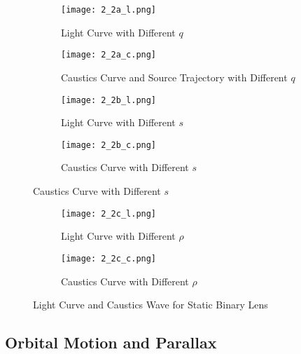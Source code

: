 \documentclass[preprint]{aastex63}
\begin{document}
\bigskip
\begin{figure}[h]
\centering
\begin{subfigure}{.49\textwidth}
  \centering
  \texttt{[image: 2\_2a\_l.png]}
  \caption{Light Curve with Different $q$}
\end{subfigure}%
\begin{subfigure}{.49\textwidth}
  \centering
  \texttt{[image: 2\_2a\_c.png]}
  \caption{Caustics Curve and Source Trajectory with Different $q$}
 \end{subfigure}
 \begin{subfigure}{.49\textwidth}
  \centering
  \texttt{[image: 2\_2b\_l.png]}
  \caption{Light Curve with Different $s$}
 \end{subfigure}
 \begin{subfigure}{.49\textwidth}
  \centering
  \texttt{[image: 2\_2b\_c.png]}
  \caption{Caustics Curve with Different $s$ }
 \end{subfigure}
\end{figure}%
\begin{figure}[h]\ContinuedFloat
\centering
 \begin{subfigure}{.49\textwidth}
  \centering
  \texttt{[image: 2\_2c\_l.png]}
  \caption{Light Curve with Different $\rho$}
\end{subfigure}%
\begin{subfigure}{.49\textwidth}
  \centering
  \texttt{[image: 2\_2c\_c.png]}
  \caption{Caustics Curve with Different $\rho$ }
\end{subfigure}%
\caption{Light Curve and Caustics Wave for Static Binary Lens}
\label{fig 3}
\end{figure}

\bigskip
\bigskip
\bigskip
\bigskip
\bigskip
\subsection{Orbital Motion and Parallax}
\end{document}
